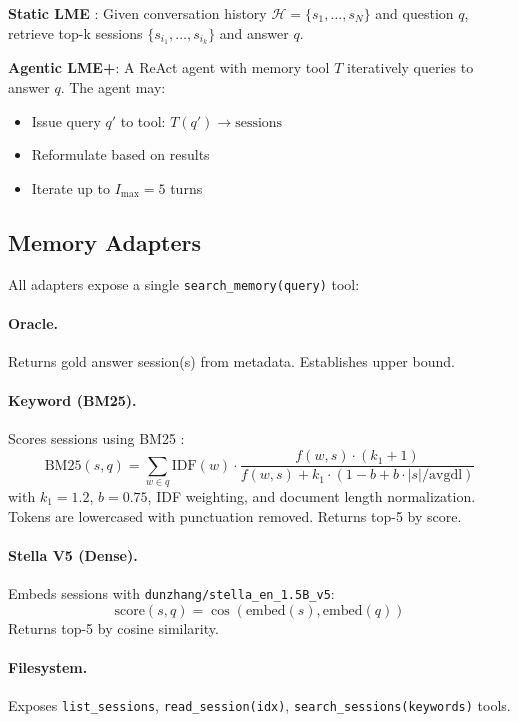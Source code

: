 \documentclass{article}
\begin{document}
\textbf{Static LME} \cite{wu2024longmemeval}: Given conversation history $\mathcal{H} = \{s_1, \ldots, s_N\}$ and question $q$, retrieve top-k sessions $\{s_{i_1}, \ldots, s_{i_k}\}$ and answer $q$.

\textbf{Agentic LME+}: A ReAct agent \cite{yao2023react} with memory tool $T$ iteratively queries to answer $q$. The agent may:
\begin{itemize}
    \item Issue query $q'$ to tool: $T(q') \rightarrow \text{sessions}$
    \item Reformulate based on results
    \item Iterate up to $I_{\text{max}} = 5$ turns
\end{itemize}

\subsection{Memory Adapters}

All adapters expose a single \texttt{search\_memory(query)} tool:

\paragraph{Oracle.} Returns gold answer session(s) from metadata. Establishes upper bound.

\paragraph{Keyword (BM25).} Scores sessions using BM25 \cite{robertson2009bm25}:
$$\text{BM25}(s, q) = \sum_{w \in q} \text{IDF}(w) \cdot \frac{f(w, s) \cdot (k_1 + 1)}{f(w, s) + k_1 \cdot (1 - b + b \cdot |s|/\text{avgdl})}$$
with $k_1 = 1.2$, $b = 0.75$, IDF weighting, and document length normalization. Tokens are lowercased with punctuation removed. Returns top-5 by score.

\paragraph{Stella V5 (Dense).} Embeds sessions with \texttt{dunzhang/stella\_en\_1.5B\_v5}:
$$\text{score}(s, q) = \cos(\text{embed}(s), \text{embed}(q))$$
Returns top-5 by cosine similarity.

\paragraph{Filesystem.} Exposes \texttt{list\_sessions}, \texttt{read\_session(idx)}, \texttt{search\_sessions(keywords)} tools.
\end{document}
